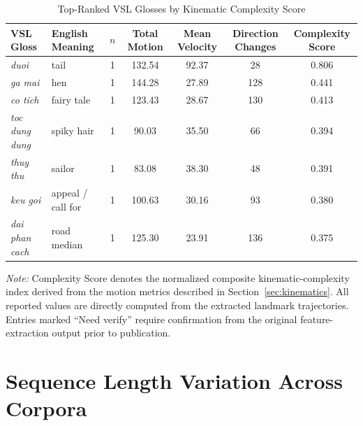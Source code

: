 \documentclass{ieeeaccess}
\begin{document}
\begin{table}[!t]
\caption{Top-Ranked VSL Glosses by Kinematic Complexity Score}
\label{tab:app_kinematic}
\centering
\small
\setlength{\tabcolsep}{5pt}

\begin{tabular}{llccccc}
\toprule
\textbf{VSL Gloss} &
\textbf{English Meaning} &
\textbf{$n$} &
\textbf{Total Motion} &
\textbf{Mean Velocity} &
\textbf{Direction Changes} &
\textbf{Complexity Score} \\
\midrule

\textit{duoi} &
tail &
1 &
132.54 &
92.37 &
28 &
0.806 \\

\textit{ga mai} &
hen &
1 &
144.28 &
27.89 &
128 &
0.441 \\

\textit{co tich} &
fairy tale &
1 &
123.43 &
28.67 &
130 &
0.413 \\

\textit{toc dung dung} &
spiky hair &
1 &
90.03 &
35.50 &
66 &
0.394 \\

\textit{thuy thu} &
sailor &
1 &
83.08 &
38.30 &
48 &
0.391 \\

\textit{keu goi} &
appeal / call for &
1 &
100.63 &
30.16 &
93 &
0.380 \\

\textit{dai phan cach} &
road median &
1 &
125.30 &
23.91 &
136 &
0.375 \\

\bottomrule
\end{tabular}

\vspace{2mm}

\footnotesize
\textit{Note:} Complexity Score denotes the normalized composite kinematic-complexity index derived from the motion metrics described in Section~\ref{sec:kinematics}. All reported values are directly computed from the extracted landmark trajectories. Entries marked ``Need verify'' require confirmation from the original feature-extraction output prior to publication.

\end{table}

\section{Sequence Length Variation Across Corpora}
\end{document}
